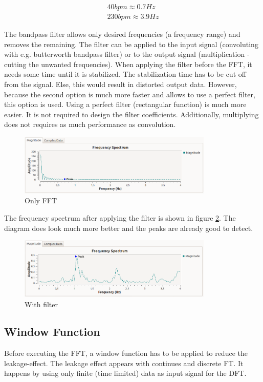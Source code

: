 \documentclass[notitlepage]{scrreprt}
\begin{document}
\begin{equation}
\begin{aligned}
40bpm \approx 0.7Hz\\
230bpm \approx 3.9Hz
\end{aligned}
\end{equation}

The bandpass filter allows only desired frequencies (a frequency range) and removes the remaining. The filter can be applied to the input signal (convoluting with e.g. butterworth bandpass filter) or to the output signal (multiplication - cutting the unwanted frequencies). When applying the filter before the FFT, it needs some time until it is stabilized. The stabilization time has to be cut off from the signal. Else, this would result in distorted output data. However, because the second option is much more faster and allows to use a perfect filter, this option is used. Using a perfect filter (rectangular function) is much more easier. It is not required to design the filter coefficients. Additionally, multiplying does not requires as much performance as convolution.

\begin{figure}[H]
	\centering
	\includegraphics[width=350px]{images/OnlyFFTNoFilterAndWindow.png}
	\caption{Only FFT}
	\label{fig:only-fft}
\end{figure}

The frequency spectrum after applying the filter is shown in figure \ref{fig:filter}. The diagram does look much more better and the peaks are already good to detect.

\begin{figure}[H]
	\centering
	\includegraphics[width=350px]{images/withFilterNoWindow.png}
	\caption{With filter}
	\label{fig:filter}
\end{figure}

\subsection{Window Function}
Before executing the FFT, a window function has to be applied to reduce the leakage-effect. The leakage effect appears with continues and discrete FT. It happens by using only finite (time limited) data as input signal for the DFT.
\end{document}
